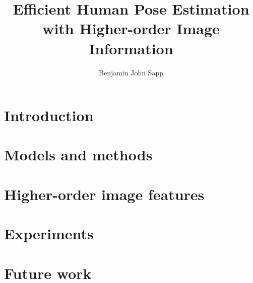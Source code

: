 \documentclass[12pt]{report}%
\begin{document}

\newcommand{\mytitle}{Efficient Human Pose Estimation with Higher-order Image Information}
\newcommand{\MYTITLE}{EFFICIENT HUMAN POSE ESTIMATION WITH HIGHER-ORDER IMAGE INFORMATION}

\title{\mytitle}
\author{Benjamin John Sapp}


  
 \beforepreface
\newpage
\copyrightpage
{}

\newpage
\abstractp

\afterpreface
{}


\newpage
{}
\pagestyle{plain}

\part{Introduction}


\clearpage
\part{Models and methods}




\clearpage
\part{Higher-order image features}


\clearpage
\part{Experiments}

\clearpage
\part{Future work}


\clearpage


\end{document}
